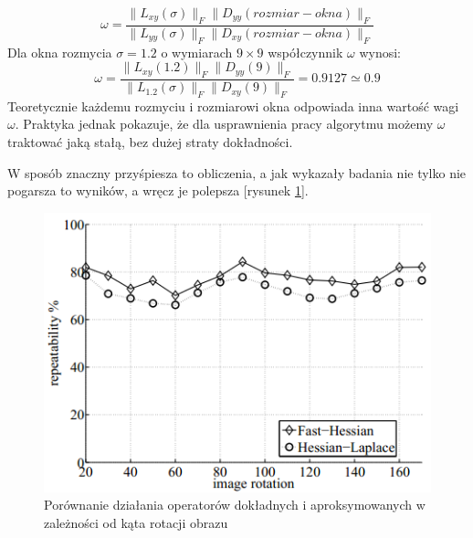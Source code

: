 \begin{equation}
\omega = \frac{\|L_{xy}(\sigma)\|_F\|D_{yy}(rozmiar-okna)\|_F}{\|L_{yy}(\sigma)\|_F\|D_{xy}(rozmiar-okna)\|_F}
\label{eqn:frobo}
\end{equation}
Dla okna rozmycia $\sigma=1.2$ o wymiarach $9\times9$ współczynnik $\omega$ wynosi:
\begin{equation}
\omega = \frac{\|L_{xy}(1.2)\|_F\|D_{yy}(9)\|_F}{\|L_{1.2}(\sigma)\|_F\|D_{xy}(9)\|_F} = 0.9127\simeq0.9
\end{equation}
Teoretycznie każdemu rozmyciu i rozmiarowi okna odpowiada inna wartość wagi $\omega$. Praktyka jednak pokazuje, że dla usprawnienia pracy algorytmu możemy $\omega$ traktować jaką stałą, bez dużej straty dokładności. 

 W sposób znaczny przyśpiesza to obliczenia, a jak wykazały badania \cite{HB06} nie tylko nie pogarsza to wyników, a wręcz je polepsza [rysunek \ref{fig:surf_bay_compare_fast}].




\begin{figure}[!htb]
\centering
\includegraphics[scale=0.8]{pict/02/surf/surf_bay_compare_fast.png}
\caption{Porównanie działania operatorów dokładnych i aproksymowanych w zależności od kąta rotacji obrazu}
\label{fig:surf_bay_compare_fast}
\end{figure}

